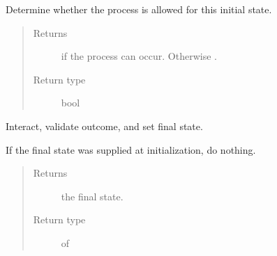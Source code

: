\documentclass[letterpaper,10pt,english]{sphinxmanual}
\begin{document}
\begin{fulllineitems}
\begin{fulllineitems}
\begin{quote}
\begin{description}
\end{description}\end{quote}

\end{fulllineitems}


\begin{fulllineitems}
\label{\detokenize{code_structure:scdc.interaction.Interaction.allowed}}
Determine whether the process is allowed for this initial state.
\begin{quote}\begin{description}
\item[{Returns}] \leavevmode
{} if the process can occur. Otherwise .

\item[{Return type}] \leavevmode
bool

\end{description}\end{quote}

\end{fulllineitems}


\begin{fulllineitems}
\label{\detokenize{code_structure:scdc.interaction.Interaction.interact}}
Interact, validate outcome, and set final state.

If the final state was supplied at initialization, do nothing.
\begin{quote}\begin{description}
\item[{Returns}] \leavevmode
the final state.

\item[{Return type}] \leavevmode
{} of 

\end{description}\end{quote}

\end{fulllineitems}



\end{fulllineitems}
\end{document}
